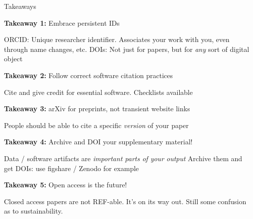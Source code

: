 \documentclass[11.5pt, aspectratio=169]{beamer}
\begin{document}

\begin{frame}{Takeaways}

  \begin{fullpageitemize}
\item {\large {\textbf{Takeaway 1: } Embrace persistent IDs}}
      \begin{itemize}
        \itemR ORCID: Unique researcher identifier. Associates your work with you, even through name changes, etc.
        \itemR DOIs: Not just for papers, but for \emph{any} sort of digital object
      \end{itemize}
      \vspace{0.5em}
      \pause

    \item { \large {\textbf{Takeaway 2: }} Follow correct software citation practices }
      \begin{itemize}
        \itemR Cite and give credit for essential software. Checklists available
      \end{itemize}
      \vspace{0.5em}
      \pause

    \item { \large {\textbf{Takeaway 3: }} arXiv for preprints, not transient website links}
      \begin{itemize}
        \itemR People should be able to cite a specific \emph{version} of your paper
      \end{itemize}
      \vspace{0.5em}
      \pause

    \item {\large {\textbf{Takeaway 4: }} Archive and DOI your supplementary material!}
      \begin{itemize}
        \itemR Data / software artifacts are \emph{important parts of your output}
        \itemR Archive them and get DOIs: use figshare / Zenodo for example
      \end{itemize}
      \vspace{0.5em}
      \pause

    \item { \large {\textbf{Takeaway 5: }} Open access is the future!}
      \begin{itemize}
        \itemR Closed access papers are not REF-able. It's on its way out.
        \itemR Still some confusion as to sustainability.
      \end{itemize}
  \end{fullpageitemize}
\end{frame}
\end{document}
